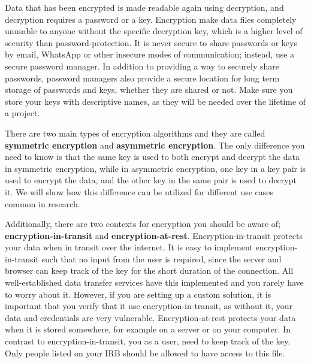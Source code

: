 Data that has been encrypted is made readable again using decryption,
and decryption requires a password or a key.
Encryption make data files completely unusable to anyone without the specific decryption key,
which is a higher level of security than password-protection.
It is never secure to share passwords or keys by email,
WhatsApp or other insecure modes of communication;
instead, use a secure password manager.
In addition to providing a way to securely share passwords,
password managers also provide a secure location
for long term storage of passwords and keys,
whether they are shared or not.
Make sure you store your keys with descriptive names,
as they will be needed over the lifetime of a project.

There are two main types of encryption algorithms and they are called
\textbf{symmetric encryption}
and \textbf{asymmetric encryption}.
The only difference you need to know is that the same key is used to both
encrypt and decrypt the data in symmetric encryption,
while in asymmetric encryption,
one key in a key pair is used to encrypt the data,
and the other key in the same pair is used to decrypt it.
We will show how this difference can be utilized for different use cases common in research.


Additionally, there are two contexts for encryption you should be aware of;
\textbf{encryption-in-transit}
and \textbf{encryption-at-rest}.
Encryption-in-transit protects your data when in transit over the internet.
It is easy to implement encryption-in-transit such that no input from the user is required,
since the server and browser can keep track of the key for the short duration of the connection.
All well-established data transfer services have this implemented and you rarely have to worry about it.
However, if you are setting up a custom solution,
it is important that you verify that it use encryption-in-transit,
as without it, your data and credentials are very vulnerable.
Encryption-at-rest protects your data when it is stored somewhere,
for example on a server or on your computer.
In contrast to encryption-in-transit,
you as a user, need to keep track of the key.
Only people listed on your IRB should be allowed to have access to this file.


